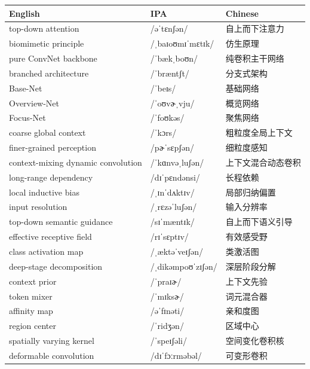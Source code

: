 \documentclass[UTF8,12pt,a4paper]{ctexart}
\providecommand{\zh}[1]{#1}
\begin{document}
\begin{tabular*}{\textwidth}{@{\extracolsep{\fill}}lll@{}}
\toprule
\textbf{English} & \textbf{IPA} & \textbf{Chinese} \\
\midrule
top-down attention & {\ipafont /əˈtɛnʃən/} & \zh{自上而下注意力} \\
biomimetic principle & {\ipafont /ˌbaɪoʊmɪˈmɛtɪk/} & \zh{仿生原理} \\
pure ConvNet backbone & {\ipafont /ˈbækˌboʊn/} & \zh{纯卷积主干网络} \\
branched architecture & {\ipafont /ˈbræntʃt/} & \zh{分支式架构} \\
Base-Net & {\ipafont /ˈbeɪs/} & \zh{基础网络} \\
Overview-Net & {\ipafont /ˈoʊvɚˌvju/} & \zh{概览网络} \\
Focus-Net & {\ipafont /ˈfoʊkəs/} & \zh{聚焦网络} \\
coarse global context & {\ipafont /ˈkɔrs/} & \zh{粗粒度全局上下文} \\
finer-grained perception & {\ipafont /pɚˈsɛpʃən/} & \zh{细粒度感知} \\
context-mixing dynamic convolution & {\ipafont /ˈkɑnvəˌluʃən/} & \zh{上下文混合动态卷积} \\
long-range dependency & {\ipafont /dɪˈpɛndənsi/} & \zh{长程依赖} \\
local inductive bias & {\ipafont /ˌɪnˈdʌktɪv/} & \zh{局部归纳偏置} \\
input resolution & {\ipafont /ˌrɛzəˈluʃən/} & \zh{输入分辨率} \\
top-down semantic guidance & {\ipafont /sɪˈmæntɪk/} & \zh{自上而下语义引导} \\
effective receptive field & {\ipafont /rɪˈsɛptɪv/} & \zh{有效感受野} \\
class activation map & {\ipafont /ˌæktəˈveɪʃən/} & \zh{类激活图} \\
deep-stage decomposition & {\ipafont /ˌdikəmpoʊˈzɪʃən/} & \zh{深层阶段分解} \\
context prior & {\ipafont /ˈpraɪɚ/} & \zh{上下文先验} \\
token mixer & {\ipafont /ˈmɪksɚ/} & \zh{词元混合器} \\
affinity map & {\ipafont /əˈfɪnəti/} & \zh{亲和度图} \\
region center & {\ipafont /ˈridʒən/} & \zh{区域中心} \\
spatially varying kernel & {\ipafont /ˈspeɪʃəli/} & \zh{空间变化卷积核} \\
deformable convolution & {\ipafont /dɪˈfɔːrməbəl/} & \zh{可变形卷积} \\

\end{tabular*}
\end{document}
